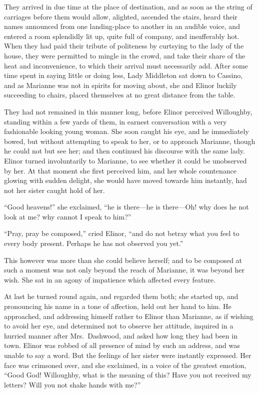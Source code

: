 \documentclass{article}
\begin{document}
They arrived in due time at the place of destination,
and as soon as the string of carriages before them
would allow, alighted, ascended the stairs, heard their
names announced from one landing-place to another in an
audible voice, and entered a room splendidly lit up,
quite full of company, and insufferably hot.  When they had
paid their tribute of politeness by curtsying to the lady
of the house, they were permitted to mingle in the crowd,
and take their share of the heat and inconvenience, to
which their arrival must necessarily add.  After some time
spent in saying little or doing less, Lady Middleton sat
down to Cassino, and as Marianne was not in spirits for
moving about, she and Elinor luckily succeeding to chairs,
placed themselves at no great distance from the table.

They had not remained in this manner long, before Elinor
perceived Willoughby, standing within a few yards
of them, in earnest conversation with a very fashionable
looking young woman.  She soon caught his eye, and he
immediately bowed, but without attempting to speak to her,
or to approach Marianne, though he could not but see her;
and then continued his discourse with the same lady.
Elinor turned involuntarily to Marianne, to see whether
it could be unobserved by her.  At that moment she first
perceived him, and her whole countenance glowing with
sudden delight, she would have moved towards him instantly,
had not her sister caught hold of her.

``Good heavens!'' she exclaimed, ``he is there---he
is there---Oh! why does he not look at me? why cannot
I speak to him?''

``Pray, pray be composed,'' cried Elinor, ``and do
not betray what you feel to every body present.
Perhaps he has not observed you yet.''

This however was more than she could believe herself;
and to be composed at such a moment was not only beyond
the reach of Marianne, it was beyond her wish.  She sat
in an agony of impatience which affected every feature.

At last he turned round again, and regarded them both;
she started up, and pronouncing his name in a tone
of affection, held out her hand to him.  He approached,
and addressing himself rather to Elinor than Marianne,
as if wishing to avoid her eye, and determined not to
observe her attitude, inquired in a hurried manner after
Mrs.\ Dashwood, and asked how long they had been in town.
Elinor was robbed of all presence of mind by such an address,
and was unable to say a word.  But the feelings of her sister
were instantly expressed.  Her face was crimsoned over,
and she exclaimed, in a voice of the greatest emotion,
``Good God! Willoughby, what is the meaning of this?
Have you not received my letters?  Will you not shake
hands with me?''
\end{document}
